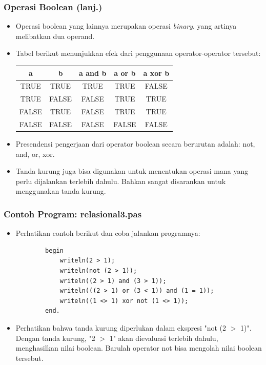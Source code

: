 \documentclass{beamer}
\begin{document}
\begin{frame}
\frametitle{Operasi Boolean (lanj.)}
\begin{itemize}
	\item Operasi boolean yang lainnya merupakan operasi \textit{binary}, yang artinya melibatkan dua operand.
	\item Tabel berikut menunjukkan efek dari penggunaan operator-operator tersebut:
	\begin{tabular}{|c|c|c|c|c|}
	\hline a & b & a and b & a or b & a xor b \\ 
	\hline TRUE & TRUE & TRUE & TRUE & FALSE \\ 
	\hline TRUE & FALSE & FALSE & TRUE & TRUE \\ 
	\hline FALSE & TRUE & FALSE & TRUE & TRUE\\ 
	\hline FALSE & FALSE & FALSE & FALSE & FALSE \\ 
	\hline 
	\end{tabular} 
	\item Presendensi pengerjaan dari operator boolean secara berurutan adalah: not, and, or, xor.
	\item Tanda kurung juga bisa digunakan untuk menentukan operasi mana yang perlu dijalankan terlebih dahulu. Bahkan sangat disarankan untuk menggunakan tanda kurung.
\end{itemize}
\end{frame}

\begin{frame}[fragile]
\frametitle{Contoh Program: relasional3.pas}
\begin{itemize}
	\item Perhatikan contoh berikut dan coba jalankan programnya:
	\begin{lstlisting}
		begin
		    writeln(2 > 1);
		    writeln(not (2 > 1));
		    writeln((2 > 1) and (3 > 1));
		    writeln(((2 > 1) or (3 < 1)) and (1 = 1));
		    writeln((1 <> 1) xor not (1 <> 1));
		end.
	\end{lstlisting}
	\item Perhatikan bahwa tanda kurung diperlukan dalam ekspresi "not (2 $>$ 1)". Dengan tanda kurung, "2 $>$ 1" akan dievaluasi terlebih dahulu, menghasilkan nilai boolean. Barulah operator not bisa mengolah nilai boolean tersebut.
\end{itemize}
\end{frame}
\end{document}
